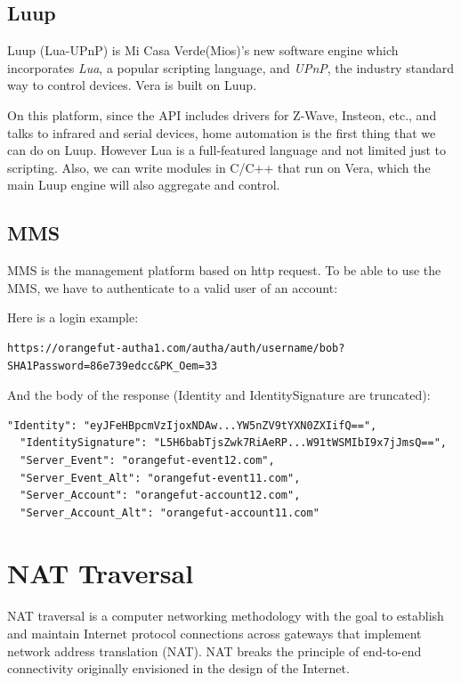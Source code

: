 \subsection{Luup}
Luup (Lua-UPnP) is Mi Casa Verde(Mios)’s new software engine which incorporates \textit{Lua}, a popular scripting language, and \textit{UPnP}, the industry standard way to control devices. Vera is built on Luup.

On this platform, since the API includes drivers for Z-Wave, Insteon, etc., and talks to infrared and serial devices, home automation is the first thing that we can do on Luup. However Lua is a full-featured language and not limited just to scripting. Also, we can write modules in C/C++ that run on Vera, which the main Luup engine will also aggregate and control.

\subsection{MMS}
MMS is the management platform based on http request. To be able to use the MMS, we have to authenticate to a valid user of an account:

Here is a login example:
\begin{lstlisting}[mathescape]
	https://orangefut-autha1.com/autha/auth/username/bob?SHA1Password=86e739edcc&PK_Oem=33
\end{lstlisting}

And the body of the response (Identity and IdentitySignature are truncated):

\begin{lstlisting}[mathescape]
  "Identity": "eyJFeHBpcmVzIjoxNDAw...YW5nZV9tYXN0ZXIifQ==",
  "IdentitySignature": "L5H6babTjsZwk7RiAeRP...W91tWSMIbI9x7jJmsQ==",
  "Server_Event": "orangefut-event12.com",
  "Server_Event_Alt": "orangefut-event11.com",
  "Server_Account": "orangefut-account12.com",
  "Server_Account_Alt": "orangefut-account11.com"
\end{lstlisting}
\section{NAT Traversal}
NAT traversal is a computer networking methodology with the goal to establish and maintain Internet protocol connections across gateways that implement network address translation (NAT). NAT breaks the principle of end-to-end connectivity originally envisioned in the design of the Internet.


